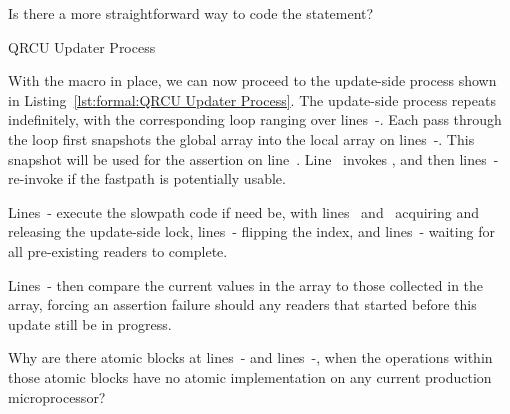 \QuickQuiz{}
	Is there a more straightforward way to code the  statement?
 \QuickQuizEnd

\begin{listing}[htbp]

\caption{QRCU Updater Process}
\label{lst:formal:QRCU Updater Process}
\end{listing}

\begin{lineref}
With the  macro in place, we can now proceed
to the update-side process shown in
Listing~\ref{lst:formal:QRCU Updater Process}.
The update-side process repeats indefinitely, with the corresponding
 loop ranging over lines~-.
Each pass through the loop first snapshots the global 
array into the local  array on
lines~-.
This snapshot will be used for the assertion on line~.
Line~ invokes , and then
lines~-
re-invoke  if the fastpath is potentially
usable.

Lines~- execute the slowpath code if need be, with
lines~ and~ acquiring and releasing the update-side lock,
lines~- flipping the index, and
lines~- waiting for
all pre-existing readers to complete.

Lines~- then compare the current values
in the 
array to those collected in the  array,
forcing an assertion failure should any readers that started before
this update still be in progress.
\end{lineref}

\QuickQuiz{}
	\begin{lineref}
	Why are there atomic blocks at lines~-
	and lines~-, when the operations
	within those atomic
	blocks have no atomic implementation on any current
	production microprocessor?
	\end{lineref}
 \QuickQuizEnd

